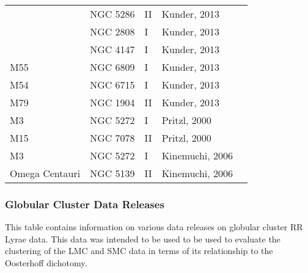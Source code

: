 \documentclass[]{article}
\begin{document}
\begin{longtable}{
	p{1.5cm}|
	p{2.5cm}|
	p{2.5cm}|
	p{3.7cm}|
	p{5.5cm}
	@{}}
		& NGC 5286     & II         & Kunder, 2013         &                                                                        \\
		& NGC 2808     & I          & Kunder, 2013         &                                                                        \\
		& NGC 4147     & I          & Kunder, 2013         &                                                                        \\
		M55            & NGC 6809     & I          & Kunder, 2013         &                                                                        \\
		M54            & NGC 6715     & I          & Kunder, 2013         &                                                                        \\
		M79            & NGC 1904     & II         & Kunder, 2013         &                                                                        \\
		M3             & NGC 5272     & I          & Pritzl, 2000 \cite{pritzl_2000_a}         &                                                                        \\
		M15            & NGC 7078     & II         & Pritzl, 2000         &                                                                        \\
		M3             & NGC 5272     & I          & Kinemuchi, 2006 \cite{kinemuchi_2006_a}      &                                                                        \\
		Omega Centauri & NGC 5139     & II         & Kinemuchi, 2006      &                                                                       
\end{longtable}

\newpage

\subsubsection{Globular Cluster Data Releases}
\label{sec:app_data_releases}

This table contains information on various data releases on globular cluster RR Lyrae data. This data was intended to be used to be used to evaluate the clustering of the LMC and SMC data in terms of its relationship to the Oosterhoff dichotomy.

\vspace{12pt}
\end{document}
